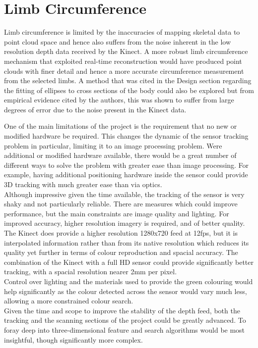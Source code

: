 \section{Limb Circumference}

Limb circumference is limited by the inaccuracies of mapping skeletal data to point cloud space and hence also suffers from the noise inherent in the low resolution depth data received by the Kinect. A more robust limb circumference mechanism that exploited real-time reconstruction would have produced point clouds with finer detail and hence a more accurate circumference measurement from the selected limbs. A method that was cited in the Design section regarding the fitting of ellipses to cross sections of the body could also be explored but from empirical evidence cited by the authors, this was shown to suffer from large degrees of error due to the noise present in the Kinect data.

One of the main limitations of the project is the requirement that no new or modified hardware be required. This changes the dynamic of the sensor tracking problem in particular, limiting it to an image processing problem. Were additional or modified hardware available, there would be a great number of different ways to solve the problem with greater ease than image processing. For example, having additional positioning hardware inside the sensor could provide 3D tracking with much greater ease than via optics.\\

Although impressive given the time available, the tracking of the sensor is very shaky and not particularly reliable. There are measures which could improve performance, but the main constraints are image quality and lighting. For improved accuracy, higher resolution imagery is required, and of better quality. The Kinect does provide a higher resolution 1280x720 feed at 12fps, but it is interpolated information rather than from its native resolution which reduces its quality yet further in terms of colour reproduction and spacial accuracy. The combination of the Kinect with a full HD sensor could provide significantly better tracking, with a spacial resolution nearer 2mm per pixel.\\

Control over lighting and the materials used to provide the green colouring would help significantly as the colour detected across the sensor would vary much less, allowing a more constrained colour search.\\

Given the time and scope to improve the stability of the depth feed, both the tracking and the scanning sections of the project could be greatly advanced. To foray deep into three-dimensional feature and search algorithms would be most insightful, though significantly more complex.\\
